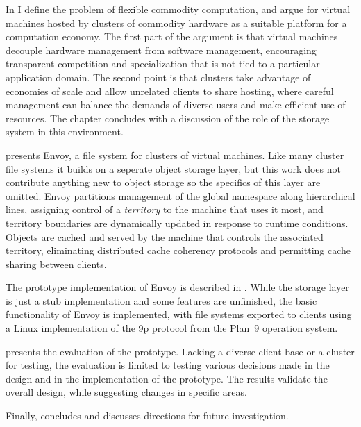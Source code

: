 In  I define the problem of flexible commodity computation, and argue for virtual machines hosted by clusters of commodity hardware as a suitable platform for a computation economy. The first part of the argument is that virtual machines decouple hardware management from software management, encouraging transparent competition and specialization that is not tied to a particular application domain. The second point is that clusters take advantage of economies of scale and allow unrelated clients to share hosting, where careful management can balance the demands of diverse users and make efficient use of resources. The chapter concludes with a discussion of the role of the storage system in this environment.

 presents Envoy, a file system for clusters of virtual machines. Like many cluster file systems it builds on a seperate object storage layer, but this work does not contribute anything new to object storage so the specifics of this layer are omitted. Envoy partitions management of the global namespace along hierarchical lines, assigning control of a \emph{territory} to the machine that uses it most, and territory boundaries are dynamically updated in response to runtime conditions. Objects are cached and served by the machine that controls the associated territory, eliminating distributed cache coherency protocols and permitting cache sharing between clients.

The prototype implementation of Envoy is described in . While the storage layer is just a stub implementation and some features are unfinished, the basic functionality of Envoy is implemented, with file systems exported to clients using a Linux implementation of the 9p protocol from the Plan~9 operation system.

 presents the evaluation of the prototype. Lacking a diverse client base or a cluster for testing, the evaluation is limited to testing various decisions made in the design and in the implementation of the prototype. The results validate the overall design, while suggesting changes in specific areas.

Finally,  concludes and discusses directions for future investigation.